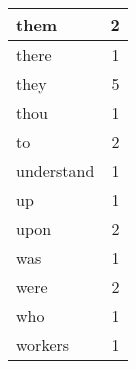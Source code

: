 \begin{center}
\begin{longtable}{l|r}
them & 2 \\ \hline
there & 1 \\ \hline
they & 5 \\ \hline
thou & 1 \\ \hline
to & 2 \\ \hline
understand & 1 \\ \hline
up & 1 \\ \hline
upon & 2 \\ \hline
was & 1 \\ \hline
were & 2 \\ \hline
who & 1 \\ \hline
workers & 1 \\ \hline
\end{longtable}
\end{center}



\normalsize



